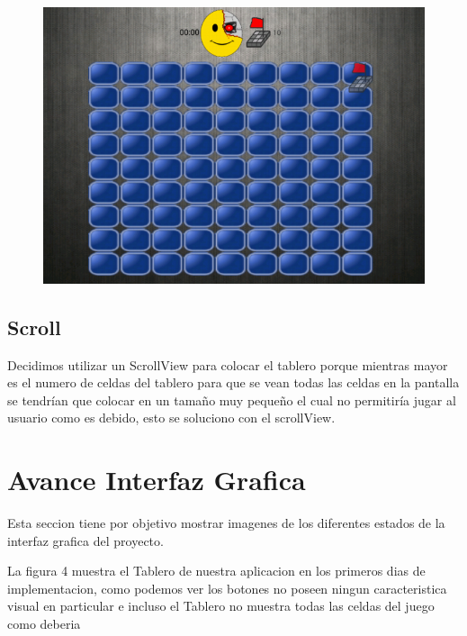 \documentclass[11pt]{article} %
\begin{document}
\begin{figure}[H]
 \begin{center}
    \includegraphics{imagenes_Documentacion/DrapandDrop}
\end{center}
\caption {}
\label{Drap and Drop}
\end{figure}


\subsection{Scroll}
Decidimos utilizar un ScrollView para colocar el tablero porque mientras mayor es el numero de celdas del tablero para que se vean todas las celdas en la pantalla se tendrían que colocar en un tamaño muy pequeño el cual no permitiría jugar al usuario como es debido, esto se soluciono con el scrollView.\\


\section{Avance Interfaz Grafica}
Esta seccion tiene por objetivo mostrar imagenes de los diferentes estados de la interfaz grafica del proyecto.

La figura 4 muestra el Tablero de nuestra aplicacion en los primeros dias de implementacion, como podemos ver los botones no poseen ningun caracteristica visual en particular e incluso el Tablero no muestra todas las celdas del juego como deberia
\end{document}
